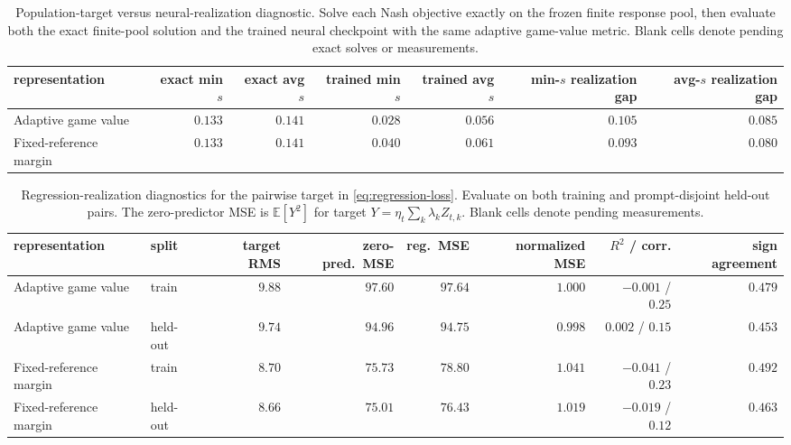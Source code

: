 \documentclass{article}
\theoremstyle{remark}
\theoremstyle{plain}
\newcommand{\E}{\mathbb{E}}
\begin{document}
\begin{table}[t]
\centering\scriptsize
\setlength{\tabcolsep}{3.0pt}
\caption{Population-target versus neural-realization diagnostic. Solve each Nash objective exactly on the frozen finite response pool, then evaluate both the exact finite-pool solution and the trained neural checkpoint with the same adaptive game-value metric. Blank cells denote pending exact solves or measurements.}
\label{tab:finite-pool-realization}
\begin{tabular}{lrrrrrr}
\toprule
representation & exact min $s$ & exact avg $s$ & trained min $s$ & trained avg $s$ & min-$s$ realization gap & avg-$s$ realization gap\\
\midrule
Adaptive game value & $0.133$ & $0.141$ & $0.028$ & $0.056$ & $0.105$ & $0.085$ \\
Fixed-reference margin & $0.133$ & $0.141$ & $0.040$ & $0.061$ & $0.093$ & $0.080$ \\
\bottomrule
\end{tabular}
\end{table}

\begin{table}[t]
\centering\scriptsize
\setlength{\tabcolsep}{2.4pt}
\caption{Regression-realization diagnostics for the pairwise target in \eqref{eq:regression-loss}. Evaluate on both training and prompt-disjoint held-out pairs. The zero-predictor MSE is $\E[Y^2]$ for target $Y=\eta_t\sum_k\lambda_k Z_{t,k}$. Blank cells denote pending measurements.}
\label{tab:regression-realization}
\begin{tabular}{llrrrrrr}
\toprule
representation & split & target RMS & zero-pred.\ MSE & reg.\ MSE & normalized MSE & $R^2$ / corr. & sign agreement\\
\midrule
Adaptive game value & train & $9.88$ & $97.60$ & $97.64$ & $1.000$ & $-0.001$ / $0.25$ & $0.479$ \\
Adaptive game value & held-out & $9.74$ & $94.96$ & $94.75$ & $0.998$ & $0.002$ / $0.15$ & $0.453$ \\
Fixed-reference margin & train & $8.70$ & $75.73$ & $78.80$ & $1.041$ & $-0.041$ / $0.23$ & $0.492$ \\
Fixed-reference margin & held-out & $8.66$ & $75.01$ & $76.43$ & $1.019$ & $-0.019$ / $0.12$ & $0.463$ \\
\bottomrule
\end{tabular}
\end{table}
\end{document}
